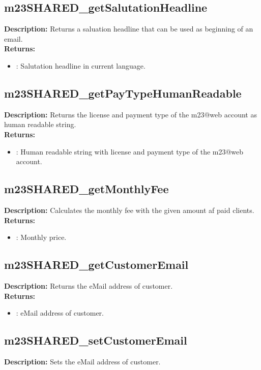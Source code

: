 \subsection{m23SHARED\_getSalutationHeadline}
\textbf{Description:} Returns a saluation headline that can be used as beginning of an email.\\
\textbf{Returns:}
\begin{itemize}
\item : Salutation headline in current language.
\end{itemize}

\subsection{m23SHARED\_getPayTypeHumanReadable}
\textbf{Description:} Returns the license and payment type of the m23@web account as human readable string.\\
\textbf{Returns:}
\begin{itemize}
\item : Human readable string with license and payment type of the m23@web account.
\end{itemize}

\subsection{m23SHARED\_getMonthlyFee}
\textbf{Description:} Calculates the monthly fee with the given amount af paid clients.\\
\textbf{Returns:}
\begin{itemize}
\item : Monthly price.
\end{itemize}

\subsection{m23SHARED\_getCustomerEmail}
\textbf{Description:} Returns the eMail address of customer.\\
\textbf{Returns:}
\begin{itemize}
\item : eMail address of customer.
\end{itemize}

\subsection{m23SHARED\_setCustomerEmail}
\textbf{Description:} Sets the eMail address of customer.\\

